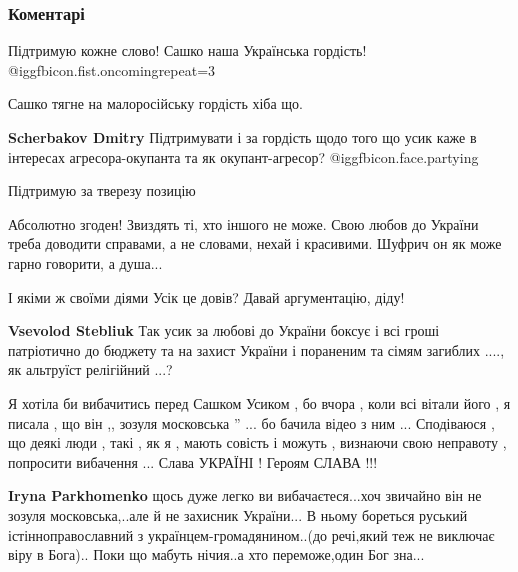  
 
 
 
 
\subsubsection{Коментарі}

\begin{itemize} %
Підтримую кожне слово! Сашко наша Українська гордість!  @igg{fbicon.fist.oncoming}{repeat=3} 

\begin{itemize} %
Сашко тягне на малоросійську гордість хіба що.

\textbf{Scherbakov Dmitry} Підтримувати і за гордість щодо того що усик каже в
інтересах агресора-окупанта та як окупант-агресор? @igg{fbicon.face.partying} 
\end{itemize} %

Підтримую за тверезу позицію


Абсолютно згоден! Звиздять ті, хто іншого не може. Свою любов до України треба
доводити справами, а не словами, нехай і красивими. Шуфрич он як може гарно
говорити, а душа...

\begin{itemize} %
І якіми ж своїми діями Усік це довів? Давай аргументацію, діду!

\textbf{Vsevolod Stebliuk} Так усик за любові до України боксує і всі гроші патріотично до бюджету та на захист України і пораненим та сімям загиблих ...., як альтруїст релігійний ...?
\end{itemize} %


Я хотіла би вибачитись перед Сашком Усиком , бо вчора , коли всі вітали його ,
я писала , що він ,, зозуля московська '' ... бо бачила відео з ним ...
Сподіваюся , що деякі люди , такі , як я , мають совість і можуть , визнаючи
свою неправоту , попросити вибачення ... Слава УКРАЇНІ ! Героям СЛАВА !!!

\begin{itemize} %
\textbf{Iryna Parkhomenko} щось дуже легко ви вибачаєтеся...хоч звичайно він не зозуля московська,..але й не захисник України...
В ньому бореться руський істінноправославний з українцем-громадянином..(до речі,який теж не виключає віру в Бога)..
Поки що мабуть нічия..а хто переможе,один Бог зна...


\end{itemize}
\end{itemize}

